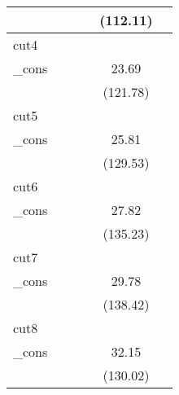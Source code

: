 {\begin{tabular}{l*{5}{c}}
            &                     &                     &                     &    (112.11)         &                     \\
\hline
cut4        &                     &                     &                     &                     &                     \\
\_cons      &                     &                     &                     &       23.69\sym{***}&                     \\
            &                     &                     &                     &    (121.78)         &                     \\
\hline
cut5        &                     &                     &                     &                     &                     \\
\_cons      &                     &                     &                     &       25.81\sym{***}&                     \\
            &                     &                     &                     &    (129.53)         &                     \\
\hline
cut6        &                     &                     &                     &                     &                     \\
\_cons      &                     &                     &                     &       27.82\sym{***}&                     \\
            &                     &                     &                     &    (135.23)         &                     \\
\hline
cut7        &                     &                     &                     &                     &                     \\
\_cons      &                     &                     &                     &       29.78\sym{***}&                     \\
            &                     &                     &                     &    (138.42)         &                     \\
\hline
cut8        &                     &                     &                     &                     &                     \\
\_cons      &                     &                     &                     &       32.15\sym{***}&                     \\
            &                     &                     &                     &    (130.02)         &                     \\

\end{tabular}}
